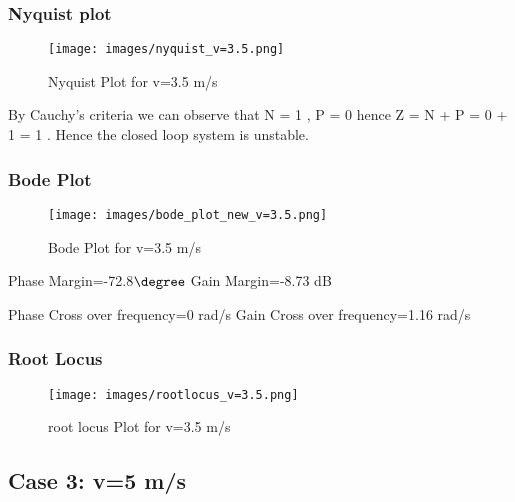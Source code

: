 \documentclass[notitlepage]{article}
\begin{document}

\subsubsection{Nyquist plot}
\begin{figure}[h]
    \centering
    \texttt{[image: images/nyquist\_v=3.5.png]}
     \caption{Nyquist Plot for v=3.5 m/s}
     \label{fig:my_label}
 \end{figure}

\small \noindent By Cauchy's criteria we can observe that N = 1 , P = 0 hence Z = N + P = 0 + 1 = 1 . Hence the closed loop system is unstable.

\newpage
\subsubsection{Bode Plot}
\begin{figure}[h]
    \centering
    \texttt{[image: images/bode\_plot\_new\_v=3.5.png]}
     \caption{Bode Plot for v=3.5 m/s}
     \label{fig:my_label}
 \end{figure}
Phase Margin=-72.8$\degree$  \hspace{25mm} Gain Margin=-8.73 dB

\vspace{1mm}
Phase Cross over frequency=0 rad/s \hspace{2mm} Gain Cross over frequency=1.16 rad/s

\newpage
\subsubsection{Root Locus}
\begin{figure}[h]
    \centering
    \texttt{[image: images/rootlocus\_v=3.5.png]}
     \caption{root locus Plot for v=3.5 m/s}
     \label{fig:my_label}
 \end{figure}

\newpage
\subsection{Case 3: v=5 m/s} 
\end{document}
